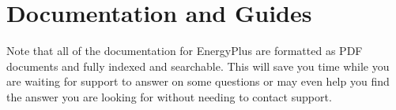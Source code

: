 \chapter{Documentation and Guides}\label{documentation-and-guides}

Note that all of the documentation for EnergyPlus are formatted as PDF documents and fully indexed and searchable. This will save you time while you are waiting for support to answer on some questions or may even help you find the answer you are looking for without needing to contact support.
